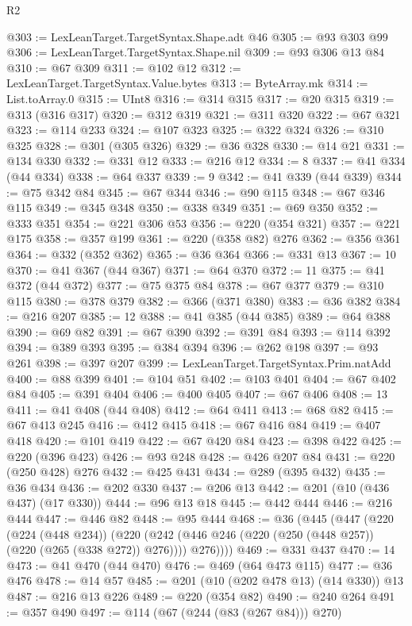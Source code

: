 \begin{lexlean}{R2}
\begin{coremodule}
@303 := LexLeanTarget.TargetSyntax.Shape.adt @46
@305 := @93 @303 @99
@306 := LexLeanTarget.TargetSyntax.Shape.nil
@309 := @93 @306 @13 @84
@310 := @67 @309
@311 := @102 @12
@312 := LexLeanTarget.TargetSyntax.Value.bytes
@313 := ByteArray.mk
@314 := List.toArray.{0}
@315 := UInt8
@316 := @314 @315
@317 := @20 @315
@319 := @313 (@316 @317)
@320 := @312 @319
@321 := @311 @320
@322 := @67 @321
@323 := @114 @233
@324 := @107 @323
@325 := @322 @324
@326 := @310 @325
@328 := @301 (@305 @326)
@329 := @36 @328
@330 := @14 @21
@331 := @134 @330
@332 := @331 @12
@333 := @216 @12
@334 := 8
@337 := @41 @334 (@44 @334)
@338 := @64 @337
@339 := 9
@342 := @41 @339 (@44 @339)
@344 := @75 @342 @84
@345 := @67 @344
@346 := @90 @115
@348 := @67 @346 @115
@349 := @345 @348
@350 := @338 @349
@351 := @69 @350
@352 := @333 @351
@354 := @221 @306 @53
@356 := @220 (@354 @321)
@357 := @221 @175
@358 := @357 @199
@361 := @220 (@358 @82) @276
@362 := @356 @361
@364 := @332 (@352 @362)
@365 := @36 @364
@366 := @331 @13
@367 := 10
@370 := @41 @367 (@44 @367)
@371 := @64 @370
@372 := 11
@375 := @41 @372 (@44 @372)
@377 := @75 @375 @84
@378 := @67 @377
@379 := @310 @115
@380 := @378 @379
@382 := @366 (@371 @380)
@383 := @36 @382
@384 := @216 @207
@385 := 12
@388 := @41 @385 (@44 @385)
@389 := @64 @388
@390 := @69 @82
@391 := @67 @390
@392 := @391 @84
@393 := @114 @392
@394 := @389 @393
@395 := @384 @394
@396 := @262 @198
@397 := @93 @261
@398 := @397 @207
@399 := LexLeanTarget.TargetSyntax.Prim.natAdd
@400 := @88 @399
@401 := @104 @51
@402 := @103 @401
@404 := @67 @402 @84
@405 := @391 @404
@406 := @400 @405
@407 := @67 @406
@408 := 13
@411 := @41 @408 (@44 @408)
@412 := @64 @411
@413 := @68 @82
@415 := @67 @413 @245
@416 := @412 @415
@418 := @67 @416 @84
@419 := @407 @418
@420 := @101 @419
@422 := @67 @420 @84
@423 := @398 @422
@425 := @220 (@396 @423)
@426 := @93 @248
@428 := @426 @207 @84
@431 := @220 (@250 @428) @276
@432 := @425 @431
@434 := @289 (@395 @432)
@435 := @36 @434
@436 := @202 @330
@437 := @206 @13
@442 := @201 (@10 (@436 @437) (@17 @330))
@444 := @96 @13 @18
@445 := @442 @444
@446 := @216 @444
@447 := @446 @82
@448 := @95 @444
@468 := @36
    (@445
      (@447
        (@220
          (@224 (@448 @234))
          (@220 (@242 (@446 @246 (@220 (@250 (@448 @257)) (@220 (@265 (@338 @272)) @276)))) @276))))
@469 := @331 @437
@470 := 14
@473 := @41 @470 (@44 @470)
@476 := @469 (@64 @473 @115)
@477 := @36 @476
@478 := @14 @57
@485 := @201 (@10 (@202 @478 @13) (@14 @330)) @13
@487 := @216 @13 @226
@489 := @220 (@354 @82)
@490 := @240 @264
@491 := @357 @490
@497 := @114 (@67 (@244 (@83 (@267 @84))) @270)

\end{coremodule}
\end{lexlean}
